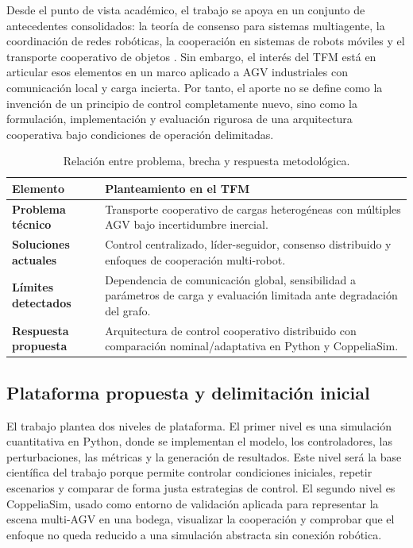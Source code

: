 \documentclass[12pt,a4paper]{article}
\begin{document}
Desde el punto de vista académico, el trabajo se apoya en un conjunto de antecedentes consolidados: la teoría de consenso para sistemas multiagente, la coordinación de redes robóticas, la cooperación en sistemas de robots móviles y el transporte cooperativo de objetos \cite{bullo2009distributed,cao1997cooperative,dudek1996taxonomy,parker2008multiple}. Sin embargo, el interés del TFM está en articular esos elementos en un marco aplicado a AGV industriales con comunicación local y carga incierta. Por tanto, el aporte no se define como la invención de un principio de control completamente nuevo, sino como la formulación, implementación y evaluación rigurosa de una arquitectura cooperativa bajo condiciones de operación delimitadas.

\begin{table}[htbp]
\centering
\caption{Relación entre problema, brecha y respuesta metodológica.}
\begin{tabularx}{\textwidth}{>{\bfseries}p{}Y}
\toprule
Elemento & Planteamiento en el TFM \\
\midrule
Problema técnico & Transporte cooperativo de cargas heterogéneas con múltiples AGV bajo incertidumbre inercial. \\
Soluciones actuales & Control centralizado, líder-seguidor, consenso distribuido y enfoques de cooperación multi-robot. \\
Límites detectados & Dependencia de comunicación global, sensibilidad a parámetros de carga y evaluación limitada ante degradación del grafo. \\
Respuesta propuesta & Arquitectura de control cooperativo distribuido con comparación nominal/adaptativa en Python y CoppeliaSim. \\
\bottomrule
\end{tabularx}
\end{table}

\subsection{Plataforma propuesta y delimitación inicial}

El trabajo plantea dos niveles de plataforma. El primer nivel es una simulación cuantitativa en Python, donde se implementan el modelo, los controladores, las perturbaciones, las métricas y la generación de resultados. Este nivel será la base científica del trabajo porque permite controlar condiciones iniciales, repetir escenarios y comparar de forma justa estrategias de control. El segundo nivel es CoppeliaSim, usado como entorno de validación aplicada para representar la escena multi-AGV en una bodega, visualizar la cooperación y comprobar que el enfoque no queda reducido a una simulación abstracta sin conexión robótica.
\end{document}
